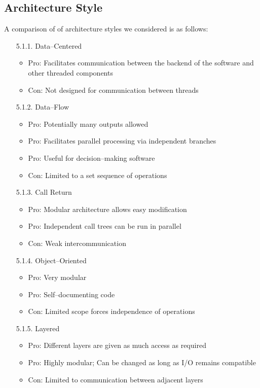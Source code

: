 \documentclass{article}
\begin{document}
	\subsection{Architecture Style}
	\indent \indent A comparison of of architecture styles we considered is as follows:
	\begin{enumerate}
		\item[5.1.1.] Data--Centered
		\begin{itemize}
			\item Pro: Facilitates communication between the backend of the software and other threaded components
			\item Con: Not designed for communication between threads
		\end{itemize}	
		
		\item[5.1.2.] Data--Flow
		\begin{itemize}
			\item Pro: Potentially many outputs allowed
			\item Pro: Facilitates parallel processing via independent branches
			\item Pro: Useful for decision--making software
			\item Con: Limited to a set sequence of operations
		\end{itemize}	
		
		\item[5.1.3.] Call Return
		\begin{itemize}
			\item Pro: Modular architecture allows easy modification
			\item Pro: Independent call trees can be run in parallel
			\item Con: Weak intercommunication
		\end{itemize}	
		
		\item[5.1.4.] Object--Oriented
		\begin{itemize}
			\item Pro: Very modular
			\item Pro: Self--documenting code
			\item Con: Limited scope forces independence of operations
		\end{itemize}	
		
		\item[5.1.5.] Layered
		\begin{itemize}
			\item Pro: Different layers are given as much access as required
			\item Pro: Highly modular; Can be changed as long as I/O remains compatible
			\item Con: Limited to communication between adjacent layers
		\end{itemize}	
		

\end{enumerate}
\end{document}
